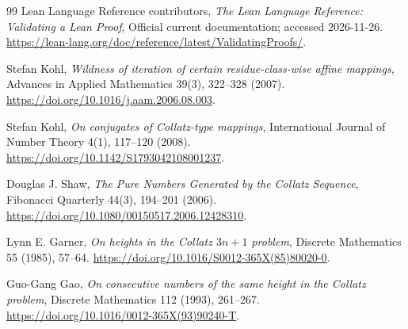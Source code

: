 \begin{thebibliography}{99}
Lean Language Reference contributors,
\emph{The Lean Language Reference: Validating a Lean Proof},
Official current documentation; accessed 2026-11-26.
\url{https://lean-lang.org/doc/reference/latest/ValidatingProofs/}.

Stefan Kohl,
\emph{Wildness of iteration of certain residue-class-wise affine mappings},
Advances in Applied Mathematics 39(3), 322--328 (2007).
\url{https://doi.org/10.1016/j.aam.2006.08.003}.

Stefan Kohl,
\emph{On conjugates of Collatz-type mappings},
International Journal of Number Theory 4(1), 117--120 (2008).
\url{https://doi.org/10.1142/S1793042108001237}.

Douglas J. Shaw,
\emph{The Pure Numbers Generated by the Collatz Sequence},
Fibonacci Quarterly 44(3), 194--201 (2006).
\url{https://doi.org/10.1080/00150517.2006.12428310}.

Lynn E. Garner, \emph{On heights in the Collatz $3n+1$ problem},
Discrete Mathematics 55 (1985), 57--64.
\url{https://doi.org/10.1016/S0012-365X(85)80020-0}.

Guo-Gang Gao, \emph{On consecutive numbers of the same height in the
Collatz problem}, Discrete Mathematics 112 (1993), 261--267.
\url{https://doi.org/10.1016/0012-365X(93)90240-T}.

\end{thebibliography}
